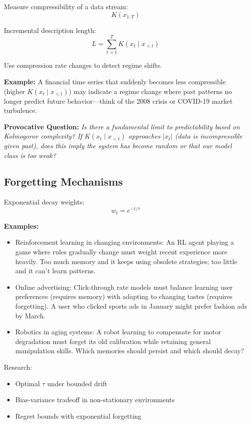   Measure compressibility of a data stream:
  \[
    K(x_{1:T})
  \]

  Incremental description length:
  \[
    L = \sum_{t=1}^{T}K(x_{t}\mid x_{<t})
  \]

  Use compression rate changes to detect regime shifts.

  \textbf{Example:} A financial time series that suddenly becomes less
  compressible (higher $K(x_{t}\mid x_{<t})$) may indicate a regime
  change where past patterns no longer predict future behavior—think of
  the 2008 crisis or COVID-19 market turbulence.

  \textbf{Provocative Question:} \textit{Is there a fundamental limit to
  predictability based on Kolmogorov complexity? If $K(x_{t}\mid x_{<t})$
  approaches $|x_{t}|$ (data is incompressible given past), does this
  imply the system has become random or that our model class is too weak?}

  \subsection*{Forgetting Mechanisms}

  Exponential decay weights:
  \[
    w_{t}= e^{-t/\tau}
  \]

  \textbf{Examples:}
  \begin{itemize}
    \item Reinforcement learning in changing environments: An RL agent
      playing a game where rules gradually change must weight recent
      experience more heavily. Too much memory and it keeps using obsolete
      strategies; too little and it can't learn patterns.

    \item Online advertising: Click-through rate models must balance
      learning user preferences (requires memory) with adapting to
      changing tastes (requires forgetting). A user who clicked sports ads
      in January might prefer fashion ads by March.

    \item Robotics in aging systems: A robot learning to compensate for
      motor degradation must forget its old calibration while retaining
      general manipulation skills. Which memories should persist and which
      should decay?
  \end{itemize}

  Research:
  \begin{itemize}
    \item Optimal $\tau$ under bounded drift

    \item Bias-variance tradeoff in non-stationary environments

    \item Regret bounds with exponential forgetting
  \end{itemize}

